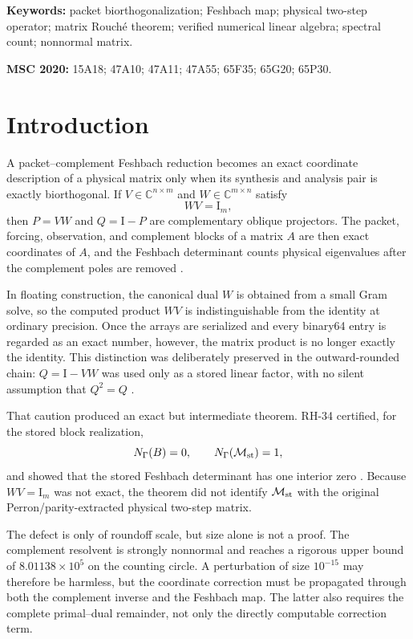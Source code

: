 \documentclass[11pt]{article}
\theoremstyle{definition}
\theoremstyle{remark}
\newcommand{\C}{\mathbb C}
\newcommand{\Id}{\mathrm I}
\newcommand{\Mstored}{\mathcal M_{\rm st}}
\begin{document}
\noindent\textbf{Keywords:} packet biorthogonalization; Feshbach map;
physical two-step operator; matrix Rouch\'e theorem; verified numerical
linear algebra; spectral count; nonnormal matrix.

\medskip
\noindent\textbf{MSC 2020:} 15A18; 47A10; 47A11; 47A55; 65F35; 65G20;
65P30.

\section{Introduction}
\label{sec:introduction}

A packet--complement Feshbach reduction becomes an exact coordinate
description of a physical matrix only when its synthesis and analysis pair
is exactly biorthogonal.  If \(V\in\C^{n\times m}\) and
\(W\in\C^{m\times n}\) satisfy
\[
 WV=\Id_m,
\]
then \(P=VW\) and \(Q=\Id-P\) are complementary oblique projectors.  The
packet, forcing, observation, and complement blocks of a matrix \(A\) are
then exact coordinates of \(A\), and the Feshbach determinant counts
physical eigenvalues after the complement poles are removed
\citep{WangPhysicalFeshbach2026,WangContourFeshbach2026}.

In floating construction, the canonical dual \(W\) is obtained from a small
Gram solve, so the computed product \(WV\) is indistinguishable from the
identity at ordinary precision.  Once the arrays are serialized and every
binary64 entry is regarded as an exact number, however, the matrix product
is no longer exactly the identity.  This distinction was deliberately
preserved in the outward-rounded chain: \(Q=\Id-VW\) was used only as a
stored linear factor, with no silent assumption that \(Q^2=Q\)
\citep{WangOutwardCode2026,WangAtlas2026}.

That caution produced an exact but intermediate theorem.  RH-34 certified,
for the stored block realization,
\[
 N_\Gamma(B)=0,\qquad
 N_\Gamma(\Mstored)=1,
\]
and showed that the stored Feshbach determinant has one interior zero
\citep{WangInterior2026}.  Because \(WV=\Id_m\) was not exact, the theorem
did not identify \(\Mstored\) with the original
Perron/parity-extracted physical two-step matrix.

The defect is only of roundoff scale, but size alone is not a proof.
The complement resolvent is strongly nonnormal and reaches a rigorous upper
bound of \(8.01138\times10^5\) on the counting circle.  A perturbation of
size \(10^{-15}\) may therefore be harmless, but the coordinate correction
must be propagated through both the complement inverse and the Feshbach
map.  The latter also requires the complete primal--dual remainder, not only
the directly computable correction term.
\end{document}
